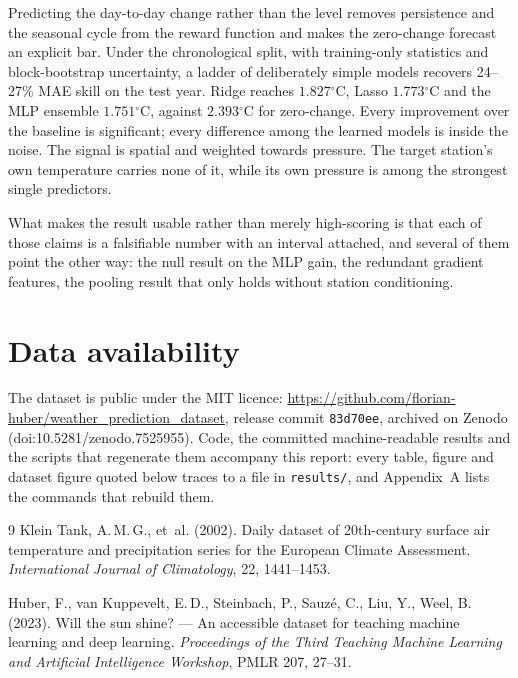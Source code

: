\documentclass[11pt,a4paper]{article}
\newcommand{\tc}{\ensuremath{^{\circ}\mathrm{C}}}
\begin{document}
Predicting the day-to-day change rather than the level removes persistence and the seasonal cycle from the reward function and makes the zero-change forecast an explicit bar. Under the chronological split, with training-only statistics and block-bootstrap uncertainty, a ladder of deliberately simple models recovers 24--27\% MAE skill on the test year. Ridge reaches $1.827\tc$, Lasso $1.773\tc$ and the MLP ensemble $1.751\tc$, against $2.393\tc$ for zero-change. Every improvement over the baseline is significant; every difference among the learned models is inside the noise. The signal is spatial and weighted towards pressure. The target station's own temperature carries none of it,
while its own pressure is among the strongest single predictors.

What makes the result usable rather than merely high-scoring is that each of those claims is a falsifiable number with an interval attached, and several of them point the other way: the null result on the MLP gain, the redundant gradient features, the pooling result that only holds without station conditioning.

\section*{Data availability}
\sloppy
The dataset is public under the MIT licence: \url{https://github.com/florian-huber/weather_prediction_dataset}, release commit \texttt{83d70ee}, archived on Zenodo (doi:10.5281/zenodo.7525955). Code, the committed machine-readable results and the scripts that regenerate them accompany this report: every table, figure and dataset figure quoted below traces to a file in \texttt{results/}, and Appendix~A lists the commands that rebuild them.

\begin{thebibliography}{9}
Klein Tank, A.\,M.\,G., et~al. (2002).
Daily dataset of 20th-century surface air temperature and precipitation series for the European Climate Assessment.
\emph{International Journal of Climatology}, 22, 1441--1453.

Huber, F., van Kuppevelt, E.\,D., Steinbach, P., Sauz\'e, C., Liu, Y., Weel, B. (2023).
Will the sun shine? --- An accessible dataset for teaching machine learning and deep learning.
\emph{Proceedings of the Third Teaching Machine Learning and Artificial Intelligence Workshop}, PMLR 207, 27--31.
\end{thebibliography}
\end{document}
